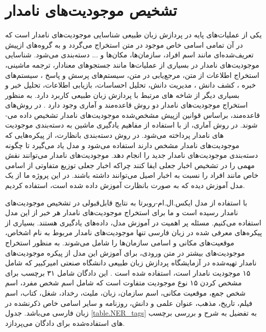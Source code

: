 \section{تشخیص موجودیت‌های نامدار}
یکی از عملیات‌های پایه در پردازش‌ زبان طبیعی شناسایی موجودیت­‌های نامدار است که در آن تمامی­ اسامی خاص موجود در متن استخراج می‌گردد و به گروه‌های ازپیش ‌تعریف‌شده‌ای مانند اسم افراد، سازمان‌ها، مکان‌ها و ... دسته‌بندی می‌شود. شناسایی موجودیت­‌های نامدار در بسیاری از عملیات‌ها مانند جستجوهای معنادار، ترجمه ماشینی، استخراج اطلاعات از متن، مرجع‌یابی در متن، سیستم­‌های پرسش و پاسخ ، سیستم‌های خبره ، کشف دانش ، مدیریت دانش، تحلیل احساسات، بازیابی اطلاعات، تحلیل خبر و بسیاری دیگر از شاخه های مرتبط با پردازش زبان­ طبیعی کاربرد دارد. 
به منظور استخراج موجودیت‌های نامدار دو روش قاعده‌مند و آماری وجود دارد \citep{Jurafsky2009}. در روش‌­های قاعده‌مند، براساس قوانین از‌پیش مشخص‌شده موجودیت‌­های نامدار تشخیص داده می‌­شوند. در روش آماری، از با استفاده از مفاهیم یادگیری ماشین به دسته­‌بندی موجودیت­‌های نامدار پرداخته می‌شود. در روش دسته‌بندی بانظارت، از پیکره‌هایی که موجودیت‌های نامدار مشخص دارند استفاده می‌شود و مدل یاد می‌گیرد تا چگونه دسته‌بندی موجودیت‌های نامدار جدید را انجام دهد.
موجودیت‌های نامدار می‌توانند نقش مهمی را در تشخیص اخبار جعلی ایفا کنند چراکه اخبار جعلی توزیع متفاوتی از اسامی خاص مانند افراد را نسبت به اخبار اصیل می‌توانند داشته باشند. در این پروژه ما از یک مدل آموزش دیده که به صورت بانظارت آموزش داده شده است، استفاده کردیم.

\cite{Thesis_abdolah}
با استفاده از مدل ایکس.ال.ام-روبرتا به نتایج قابل‌قبولی در تشخیص موجودیت‌های نامدار رسیده است و ما برای استخراج موجودیت‌های نامدار هر خبر از این مدل استفاده می‌کنیم. مسئله پر اهمیت در آموزش مدل، داده‌های یادگیری هستند. بسیاری از پیکره‌های معرفی شده در زبان فارسی تنها موجودیت‌های نامدار مربوط به نام اشخاص، موقعیت‌های مکانی و اسامی سازمان‌ها را شامل می‌شوند. به منظور استخراج موجودیت‌های بیشتر در متن ورودی، برای آموزش این مدل از پیکره موجودیت‌های نامدار تهیه‌شده در آزمایشگاه پردازش زبان طبیعی دانشگاه صنعتی امیرکبیر که شامل ۱۵ موجودیت نامدار است، استفاده شده است \citep{momtazi2020named}.
این دادگان شامل ۳۱ برچسب برای مشخص کردن ۱۵ نوع موجودیت متفاوت است که شامل اسم شخص مفرد، اسم شخص جمع، موقعیت مکانی، اسم سازمان، زبان، ملیت، رخداد، شغل، کتاب، اسم فیلم، تاریخ، مذهب، عنوان علمی و دانش، روزنامه و سایر اسامی خاص ذکرنشده در زبان فارسی می‌باشد. جدول \ref{table.NER_tags} به تفضیل به شرح و بررسی برچسب­‌های استفاده‌شده برای دادگان می‌پردازد.

